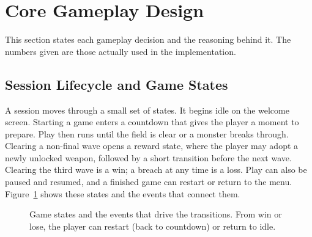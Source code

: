 \documentclass[12pt,a4paper]{report}
\begin{document}
\section{Core Gameplay Design}

This section states each gameplay decision and the reasoning behind it. The
numbers given are those actually used in the implementation.

\subsection{Session Lifecycle and Game States}

A session moves through a small set of states. It begins idle on the welcome
screen. Starting a game enters a countdown that gives the player a moment to
prepare. Play then runs until the field is clear or a monster breaks through.
Clearing a non-final wave opens a reward state, where the player may adopt a
newly unlocked weapon, followed by a short transition before the next wave.
Clearing the third wave is a win; a breach at any time is a loss. Play can also
be paused and resumed, and a finished game can restart or return to the menu.
Figure~\ref{fig:states} shows these states and the events that connect them.

\begin{figure}[htbp]
\centering
{}
\caption{Game states and the events that drive the transitions. From win or
lose, the player can restart (back to countdown) or return to idle.}
\label{fig:states}
\end{figure}
\end{document}
